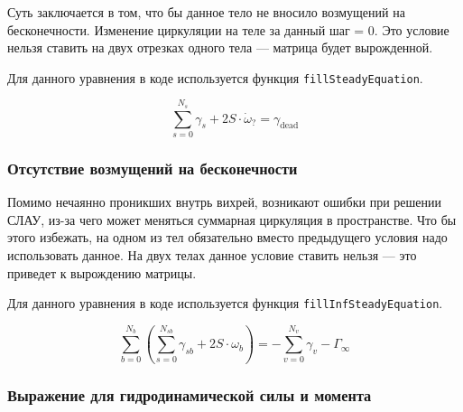 \documentclass[a4paper,14pt]{extreport}
\begin{document}
Суть заключается в том, что бы данное тело не вносило возмущений на бесконечности.
Изменение циркуляции на теле за данный шаг = 0. Это условие нельзя ставить на двух отрезках одного тела --- матрица будет вырожденной.

Для данного уравнения в коде используется функция \texttt{fillSteadyEquation}.

\begin{equation}
\sum_{s=0}^{N_s} \gamma_s + 2S \cdot \dot \omega_? = \gamma_\text{dead}
\end{equation}

\subsubsection{Отсутствие возмущений на бесконечности}
\label{slau_infsteday}

Помимо нечаянно проникших внутрь вихрей, возникают ошибки при решении СЛАУ, из-за чего может меняться суммарная циркуляция в пространстве.
Что бы этого избежать, на одном из тел обязательно вместо предыдущего условия надо использовать данное. На двух телах данное условие ставить нельзя --- это приведет к вырождению матрицы.

Для данного уравнения в коде используется функция \texttt{fillInfSteadyEquation}.

\begin{equation}
\sum_{b=0}^{N_b} \left( \sum_{s=0}^{N_{sb}} \gamma_{sb} + 2S\cdot\omega_b \right)
=
-\sum\limits_{v=0}^{N_v} \gamma_v - \Gamma_\infty
\end{equation}

\subsubsection{Выражение для гидродинамической силы и момента}
\label{slau_hydroforce}
\end{document}
